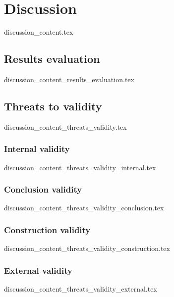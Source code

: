 \chapter{Discussion}\label{sec:discussion}
  {discussion_content.tex}

\section{Results evaluation}
  {discussion_content_results_evaluation.tex}

\section{Threats to validity}
  {discussion_content_threats_validity.tex}

\subsection{Internal validity}
  {discussion_content_threats_validity_internal.tex}

\subsection{Conclusion validity}
  {discussion_content_threats_validity_conclusion.tex}

\subsection{Construction validity}
  {discussion_content_threats_validity_construction.tex}

\subsection{External validity}
  {discussion_content_threats_validity_external.tex}
